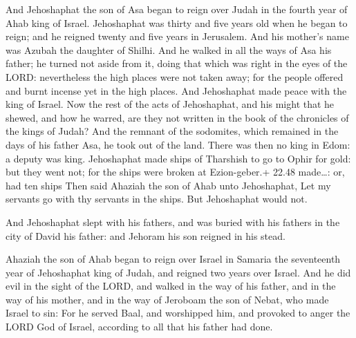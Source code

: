  And Jehoshaphat the son of Asa began to reign over Judah
in the fourth year of Ahab king of Israel.  Jehoshaphat was
thirty and five years old when he began to reign; and he reigned twenty
and five years in Jerusalem. And his mother's name was Azubah the
daughter of Shilhi.  And he walked in all the ways of Asa
his father; he turned not aside from it, doing that which was right in
the eyes of the LORD: nevertheless the high places were not taken away;
for the people offered and burnt incense yet in the high places.
 And Jehoshaphat made peace with the king of Israel.
 Now the rest of the acts of Jehoshaphat, and his might
that he shewed, and how he warred, are they not written in the book of
the chronicles of the kings of Judah?  And the remnant of
the sodomites, which remained in the days of his father Asa, he took out
of the land.  There was then no king in Edom: a deputy was
king.  Jehoshaphat made ships of Tharshish to go to Ophir
for gold: but they went not; for the ships were broken at Ezion-geber.+
22.48 made\ldots: or, had ten ships  Then said Ahaziah the
son of Ahab unto Jehoshaphat, Let my servants go with thy servants in
the ships. But Jehoshaphat would not.

 And Jehoshaphat slept with his fathers, and was buried
with his fathers in the city of David his father: and Jehoram his son
reigned in his stead.

 Ahaziah the son of Ahab began to reign over Israel in
Samaria the seventeenth year of Jehoshaphat king of Judah, and reigned
two years over Israel.  And he did evil in the sight of the
LORD, and walked in the way of his father, and in the way of his mother,
and in the way of Jeroboam the son of Nebat, who made Israel to sin:
 For he served Baal, and worshipped him, and provoked to
anger the LORD God of Israel, according to all that his father had done.
